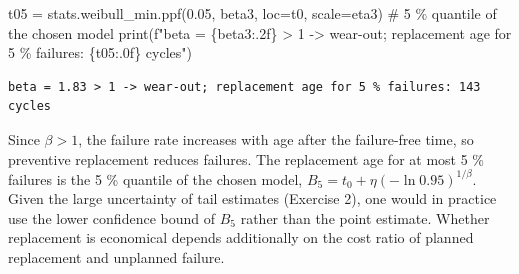 \documentclass[
  letterpaper,
  DIV=11,
  numbers=noendperiod]{scrreprt}
\newenvironment{Shaded}{\begin{snugshade}}{\end{snugshade}}
\newcommand{\BuiltInTok}[1]{\textcolor[rgb]{0.00,0.23,0.31}{#1}}
\newcommand{\CommentTok}[1]{\textcolor[rgb]{0.37,0.37,0.37}{#1}}
\newcommand{\FloatTok}[1]{\textcolor[rgb]{0.68,0.00,0.00}{#1}}
\newcommand{\NormalTok}[1]{\textcolor[rgb]{0.00,0.23,0.31}{#1}}
\newcommand{\OperatorTok}[1]{\textcolor[rgb]{0.37,0.37,0.37}{#1}}
\newcommand{\SpecialCharTok}[1]{\textcolor[rgb]{0.37,0.37,0.37}{#1}}
\newcommand{\SpecialStringTok}[1]{\textcolor[rgb]{0.13,0.47,0.30}{#1}}
\begin{document}
\begin{tcolorbox}[enhanced jigsaw, left=2mm, title=\textcolor{quarto-callout-caution-color}{\faFire}\hspace{0.5em}{Solution to Exercise 4}, opacityback=0, breakable, rightrule=.15mm, arc=.35mm, toptitle=1mm, colbacktitle=quarto-callout-caution-color!10!white, opacitybacktitle=0.6, coltitle=black, colframe=quarto-callout-caution-color-frame, bottomrule=.15mm, leftrule=.75mm, bottomtitle=1mm, titlerule=0mm, toprule=.15mm, colback=white]

\begin{Shaded}
\begin{Highlighting}[]
\NormalTok{t05 }\OperatorTok{=}\NormalTok{ stats.weibull\_min.ppf(}\FloatTok{0.05}\NormalTok{, beta3, loc}\OperatorTok{=}\NormalTok{t0, scale}\OperatorTok{=}\NormalTok{eta3)   }\CommentTok{\# 5 \% quantile of the chosen model}
\BuiltInTok{print}\NormalTok{(}\SpecialStringTok{f"beta = }\SpecialCharTok{\{}\NormalTok{beta3}\SpecialCharTok{:.2f\}}\SpecialStringTok{ \textgreater{} 1 {-}\textgreater{} wear{-}out; replacement age for 5 \% failures: }\SpecialCharTok{\{}\NormalTok{t05}\SpecialCharTok{:.0f\}}\SpecialStringTok{ cycles"}\NormalTok{)}
\end{Highlighting}
\end{Shaded}

\begin{verbatim}
beta = 1.83 > 1 -> wear-out; replacement age for 5 % failures: 143 cycles
\end{verbatim}

Since \(\beta > 1\), the failure rate increases with age after the
failure-free time, so preventive replacement reduces failures. The
replacement age for at most 5 \% failures is the 5 \% quantile of the
chosen model, \(B_5 = t_0 + \eta(-\ln 0.95)^{1/\beta}\). Given the large
uncertainty of tail estimates (Exercise 2), one would in practice use
the lower confidence bound of \(B_5\) rather than the point estimate.
Whether replacement is economical depends additionally on the cost ratio
of planned replacement and unplanned failure.

\end{tcolorbox}
\end{document}
